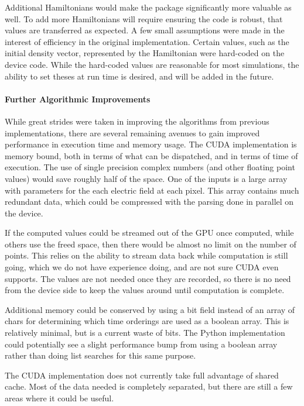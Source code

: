 Additional Hamiltonians would make the package significantly more
valuable as well. To add more Hamiltonians will require ensuring the
code is robust, that values are transferred as expected. A few small
assumptions were made in the interest of efficiency in the original
implementation. Certain values, such as the initial density vector,
represented by the Hamiltonian were hard-coded on the device code. While
the hard-coded values are reasonable for most simulations, the ability
to set theses at run time is desired, and will be added in the future.

\hypertarget{further-algorithmic-improvements}{%
\paragraph{Further Algorithmic
Improvements}\label{further-algorithmic-improvements}}

While great strides were taken in improving the algorithms from previous
implementations, there are several remaining avenues to gain improved
performance in execution time and memory usage. The CUDA implementation
is memory bound, both in terms of what can be dispatched, and in terms
of time of execution. The use of single precision complex numbers (and
other floating point values) would save roughly half of the space. One
of the inputs is a large array with parameters for the each electric
field at each pixel. This array contains much redundant data, which
could be compressed with the parsing done in parallel on the device.

If the computed values could be streamed out of the GPU once computed,
while others use the freed space, then there would be almost no limit on
the number of points. This relies on the ability to stream data back
while computation is still going, which we do not have experience doing,
and are not sure CUDA even supports. The values are not needed once they
are recorded, so there is no need from the device side to keep the
values around until computation is complete.

Additional memory could be conserved by using a bit field instead of an
array of chars for determining which time orderings are used as a
boolean array. This is relatively minimal, but is a current waste of
bits. The Python implementation could potentially see a slight
performance bump from using a boolean array rather than doing list
searches for this same purpose.

The CUDA implementation does not currently take full advantage of shared
cache. Most of the data needed is completely separated, but there are
still a few areas where it could be useful.

